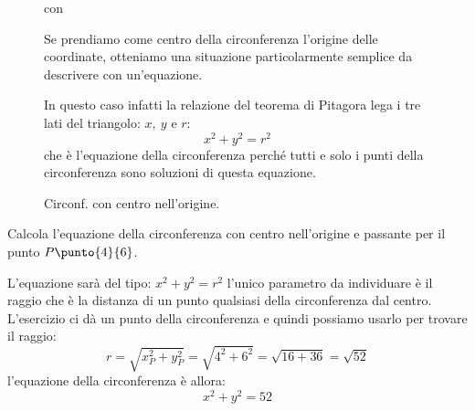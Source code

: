 \begin{figure}[h]
\centering
\begin{minipage}[]{.48\textwidth}
con 

 Se prendiamo come centro della circonferenza l'origine delle coordinate, 
otteniamo una situazione particolarmente semplice da descrivere con 
un'equazione.

In questo caso infatti la relazione del teorema di Pitagora lega i tre lati del 
triangolo: \(x,~y \text{ e } r\):
\[x^2 + y^2 = r^2\]
che è l'equazione della circonferenza perché tutti e solo i punti 
della circonferenza sono soluzioni di questa equazione.
\end{minipage}
\hfill
\begin{minipage}[]{.48\textwidth}
\begin{center}
\begin{inaccessibleblock}
  \circonfO
  \caption{Circonf. con centro nell'origine.} \label{fig:circonfO}
\end{inaccessibleblock}
\end{center}
\end{minipage}
\end{figure}

\begin{esempio}
Calcola l'equazione della circonferenza con centro nell'origine e passante per 
il punto \(P\punto{4}{6}\).

L'equazione sarà del tipo: \(x^2 + y^2 = r^2\) l'unico parametro da individuare 
è il raggio che è la distanza di un punto qualsiasi della circonferenza dal 
centro. L'esercizio ci dà un punto della circonferenza e quindi possiamo usarlo 
per trovare il raggio:
\[r = \sqrt{x_P^2 + y_P^2} = \sqrt{4^2 + 6^2} = \sqrt{16 + 36} = \sqrt{52}\]
l'equazione della circonferenza è allora:
\[x^2 + y^2 = 52\]
\end{esempio}

